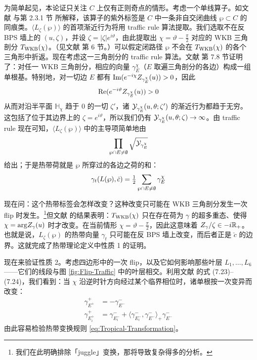 为简单起见，本论证只关注 $C$ 上仅有正则奇点的情形。考虑一个单线算子。如文献 \cite{Drukker:2009tz} 与第 2.3.1 节%
所解释，该算子的紫外标签是 $C$ 中一条非自交闭曲线 $\wp\subset C$ 的同痕类。$\langle L_\zeta(\wp)\rangle$ 的首项渐近行为将用 traffic rule 算法提取。我们选取不在反 BPS 墙上的 $(u,\zeta)$，并设 $\zeta=\vert\zeta\vert e^{i\vartheta}$，由此提取出 $\chi=\vartheta-\frac{\pi}{2}$ 对应的 WKB 三角剖分 $T_{\rm WKB}(\chi)$。（见文献 \cite{Gaiotto:2009hg} 第 6 节。）可以假定闭路径 $\wp$ 不会在 $T_{\rm WKB}(\chi)$ 的各个三角形中折返。现在考虑这一三角剖分的 traffic rule 算法。文献 \cite{Gaiotto:2009hg} 第 7.8 节证明了：对任一 WKB 三角剖分，相应的向量 $\gamma^\chi_E$（$E$ 取遍三角剖分的各边）构成一组单根基。特别地，对一切边 $E$ 都有 ${\rm Im}(e^{-i\chi}Z_{\gamma^\chi_E}(u))>0$，因此
\begin{equation}
{\rm Re}(e^{-i\vartheta}Z_{\gamma^\chi_E}(u)) > 0
\end{equation}
从而对沿半平面 $\mathbb{H}_\chi$ 趋于 $0$ 的一切 $\zeta'$，诸 $\mathcal{Y}_{\gamma_E^\chi}(u,\theta;\zeta')$ 的渐近行为都趋于无穷。这包括了位于其边界上的 $\zeta=e^{i\vartheta}$，所以我们仍有 $\mathcal{Y}_{\gamma_E^\chi}(u,\theta;\zeta)\to\infty$。由 traffic rule 现在可知，$\langle L_\zeta(\wp)\rangle$ 中的主导项简单地由
\begin{equation}
\prod_{\wp\cap E\not=\emptyset}\sqrt{\mathcal{Y}_{\gamma_E^\chi}}
\end{equation}
给出；于是热带荷就是 $\wp$ 所穿过的各边之荷的和：
\begin{equation}
\gamma_t(L(\wp),\check c) = \tfrac{1}{2}\sum_{\wp\cap E\not=\emptyset}\gamma_E^\chi
\end{equation}

现在问：这个热带标签会怎样改变？这种改变只可能在 WKB 三角剖分发生一次 flip 时发生。\footnote{我们在此明确排除「juggle」变换，那将导致复杂得多的分析。}但文献 \cite{Gaiotto:2009hg} 的结果表明：$T_{\rm WKB}(\chi)$ 只在存在荷为 $\gamma$ 的超多重态、使得 $\chi={\rm arg}Z_\gamma(u)$ 时才改变。在当前情形 $\chi=\vartheta-\frac{\pi}{2}$，因此这意味着 $Z_\gamma/\zeta\in -i\mathbb{R}_+$。也就是说，$L_\zeta(\wp)$ 的热带向量 $\gamma_t$ 只可能在反 BPS 墙上改变，而后者正是 $\check c$ 的边界。这就完成了热带理论定义中性质 1 的证明。


现在来验证性质 2。考虑四边形中的一次 flip，以及它如何影响那些叶层 $L_1,\dots,L_6$——它们的线段与图 \ref{fig:Flip-Traffic} 中的叶层相交。利用文献 \cite{Gaiotto:2009hg} 的式 (7.23)--(7.24)，我们看到：当 $\chi$ 沿逆时针方向经过某个临界相位时，诸单根按一次变异而改变：
\begin{equation}
\begin{split}
\gamma_{E^+}^+ & = -\gamma_{E^-}^- \\
\gamma_{E_i^+}^+ & = \gamma_{E_i^-}^- + \langle\gamma_{E_i^-}^-,\gamma_{E^-}^-\rangle_+ \gamma_{E^-}^-
\end{split}
\end{equation}
由此容易检验热带变换规则 \eqref{eq:Tropical-Transformation}。

